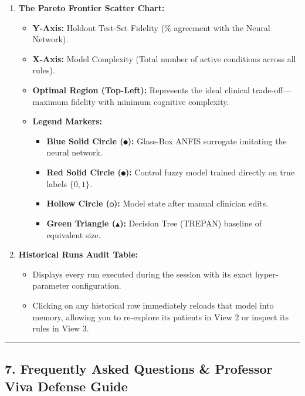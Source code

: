 \begin{enumerate}
\def\labelenumi{\arabic{enumi}.}
\tightlist
\item
  \textbf{The Pareto Frontier Scatter Chart:}

  \begin{itemize}
  \tightlist
  \item
    \textbf{Y-Axis:} Holdout Test-Set Fidelity (\(\%\) agreement with
    the Neural Network).
  \item
    \textbf{X-Axis:} Model Complexity (Total number of active conditions
    across all rules).
  \item
    \textbf{Optimal Region (Top-Left):} Represents the ideal clinical
    trade-off---maximum fidelity with minimum cognitive complexity.
  \item
    \textbf{Legend Markers:}

    \begin{itemize}
    \tightlist
    \item
      \textbf{Blue Solid Circle (\texttt{●}):} Glass-Box ANFIS surrogate
      imitating the neural network.
    \item
      \textbf{Red Solid Circle (\texttt{●}):} Control fuzzy model
      trained directly on true labels \(\{0, 1\}\).
    \item
      \textbf{Hollow Circle (\texttt{○}):} Model state after manual
      clinician edits.
    \item
      \textbf{Green Triangle (\texttt{▲}):} Decision Tree (TREPAN)
      baseline of equivalent size.
    \end{itemize}
  \end{itemize}
\item
  \textbf{Historical Runs Audit Table:}

  \begin{itemize}
  \tightlist
  \item
    Displays every run executed during the session with its exact
    hyper-parameter configuration.
  \item
    Clicking on any historical row immediately reloads that model into
    memory, allowing you to re-explore its patients in View 2 or inspect
    its rules in View 3.
  \end{itemize}
\end{enumerate}

\begin{center}\rule{0.5\linewidth}{0.5pt}\end{center}

\subsection{7. Frequently Asked Questions \& Professor Viva Defense
Guide}\label{frequently-asked-questions-professor-viva-defense-guide}

